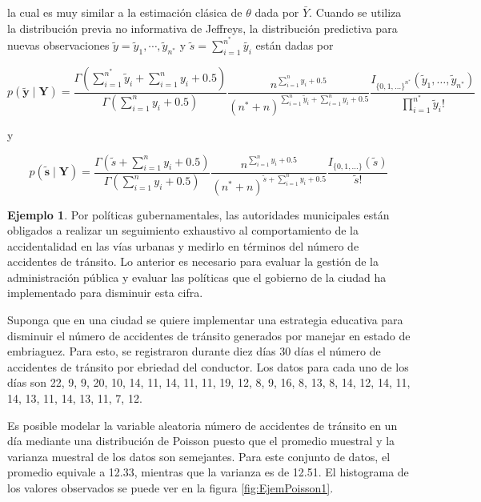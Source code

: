 \documentclass[
  10pt,
  spanish,
]{book}
\theoremstyle{definition}
\theoremstyle{definition}
\newtheorem{example}{Ejemplo}[chapter]
\theoremstyle{definition}
\theoremstyle{definition}
\theoremstyle{remark}
\begin{document}
la cual es muy similar a la estimación clásica de \(\theta\) dada por \(\bar{Y}\). Cuando se utiliza la distribución previa no informativa de Jeffreys, la distribución predictiva para nuevas observaciones \(\tilde{y}={\tilde{y}_1,\cdots,\tilde{y}_{n^*}}\) y \(\tilde{s}=\sum_{i=1}^{n^*}\tilde{y_i}\) están dadas por

\begin{equation}
\label{eq:PredPoissonJeffreys}
p(\tilde{\mathbf{y}} \mid \mathbf{Y})=\frac{\Gamma(\sum_{i=1}^{n^*}\tilde{y}_i+\sum_{i=1}^ny_i+0.5)}{\Gamma(\sum_{i=1}^ny_i+0.5)}
\frac{n^{\sum_{i=1}^ny_i+0.5}}{({n^*}+n)^{\sum_{i=1}^n\tilde{y}_i+\sum_{i=1}^ny_i+0.5}}
\frac{I_{\{0,1,\ldots\}^{n^*}}(\tilde{y}_1,\ldots,\tilde{y}_{n^*})}{\prod_{i=1}^{n^*}\tilde{y}_i!}
\end{equation}

y

\begin{equation}
\label{eq:Pred1PoissonJeffreys}
p(\tilde{\mathbf{s}} \mid \mathbf{Y})=\frac{\Gamma(\tilde{s}+\sum_{i=1}^ny_i+0.5)}{\Gamma(\sum_{i=1}^ny_i+0.5)}
\frac{n^{\sum_{i=1}^ny_i+0.5}}{({n^*}+n)^{\tilde{s}+\sum_{i=1}^ny_i+0.5}}\frac{I_{\{0,1,\ldots\}}(\tilde{s})}{\tilde{s}!}
\end{equation}

\begin{example}
\protect\hypertarget{exm:unnamed-chunk-48}{}{\label{exm:unnamed-chunk-48} }Por políticas gubernamentales, las autoridades municipales están obligados a realizar un seguimiento exhaustivo al comportamiento de la accidentalidad en las vías urbanas y medirlo en términos del número de accidentes de tránsito. Lo anterior es necesario para evaluar la gestión de la administración pública y evaluar las políticas que el gobierno de la ciudad ha implementado para disminuir esta cifra.

Suponga que en una ciudad se quiere implementar una estrategia educativa para disminuir el número de accidentes de tránsito generados por manejar en estado de embriaguez. Para esto, se registraron durante diez días 30 días el número de accidentes de tránsito por ebriedad del conductor. Los datos para cada uno de los días son 22, 9, 9, 20, 10, 14, 11, 14, 11, 11, 19, 12, 8, 9, 16, 8, 13, 8, 14, 12, 14, 11, 14, 13, 11, 14, 13, 11, 7, 12.

Es posible modelar la variable aleatoria número de accidentes de tránsito en un día mediante una distribución de Poisson puesto que el promedio muestral y la varianza muestral de los datos son semejantes. Para este conjunto de datos, el promedio equivale a 12.33, mientras que la varianza es de 12.51. El histograma de los valores observados se puede ver en la figura \ref{fig:EjemPoisson1}.
\end{example}
\end{document}
